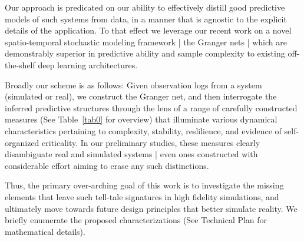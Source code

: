 \documentclass[onecolumn, compsoc,11pt]{IEEEtran}
\begin{document}
Our approach is predicated on our ability to effectively distill good predictive models of  such systems from data, in a manner that is agnostic to the explicit details of the application. To that effect we leverage our recent work on a novel  spatio-temporal stochastic modeling framework   | the Granger nets | which are  demonstrably superior in predictive ability and sample complexity to   existing off-the-shelf deep learning architectures.

Broadly our scheme is as follows: Given observation logs from a system (simulated or real), we construct the Granger net, and then interrogate the inferred predictive structures through the lens of a range of carefully constructed measures (See Table~\ref{tab0} for overview) that illuminate various  dynamical characteristics pertaining to complexity, stability, reslilience, and evidence of self-organized criticality. In our preliminary studies, these measures  clearly disambiguate real and simulated systems | even ones  constructed  with considerable  effort aiming to erase any such distinctions.

Thus, the primary over-arching goal of this work is to investigate the missing elements that  leave such tell-tale signatures in high fidelity simulations, and ultimately move towards future design principles that better simulate reality.
%
We briefly enumerate the proposed characterizations (See Technical Plan for mathematical details).
\end{document}
